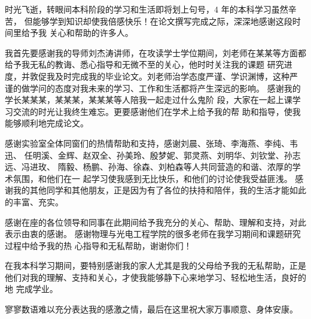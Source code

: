 \begin{thanksfor}
	
时光飞逝，转眼间本科阶段的学习和生活即将划上句号，4 年的本科学习虽然辛苦，
但能够学到知识却使我倍感快乐！在论文撰写完成之际，深深地感谢这段时间里给予我
关心和帮助的许多人。 

我首先要感谢我的导师刘杰涛讲师，在攻读学士学位期间，刘老师在某某等方面都给予我无私的教诲、悉心指导和无微不至的关心，他时时关注我的课题
研究进度，并敦促我及时完成我的毕业论文。刘老师治学态度严谨、学识渊博，这种严
谨的做学问的态度对我未来的学习、工作和生活都将产生深远的影响。 
感谢我的学长某某某，某某某，某某某等人陪我一起走过什么鬼阶
段，大家在一起上课学习交流的时光让我终生难忘。更要感谢他们在学术上给予我的帮
助和指导，使我能够顺利地完成论文。 

感谢实验室全体同窗们的热情帮助和支持，感谢刘晨、张琦、李海燕、李纯、韦迅、
任明溪、金辉、赵双全、孙美玲、殷梦妮、郭灵燕、刘明华、刘钦堂、孙志远、冯进玫、
隋毅、杨鹏、孙海、徐森、刘柏森等人共同营造的和谐、浓厚的学术氛围，和他们在一
起学习使我感到无比快乐，和他们的讨论使我受益匪浅。 
感谢我的其他同学和其他朋友，正是因为有了各位的扶持和陪伴，我的生活才能如此
的丰富、充实。 

感谢在座的各位领导和同事在此期间给予我充分的关心、帮助、理解和支持，对此表示由衷的感谢。
感谢物理与光电工程学院的很多老师在我学习期间和课题研究过程中给予我的热
心指导和无私帮助，谢谢你们！ 

在我本科学习期间，要特别感谢我的家人尤其是我的父母给予我的无私帮助，正是他们对我的理解、支持和关心，才使我能够静下心来地学习、轻松地生活，良好的地
完成学业。 

寥寥数语难以充分表达我的感激之情，最后在这里祝大家万事顺意、身体安康。 

\end{thanksfor}